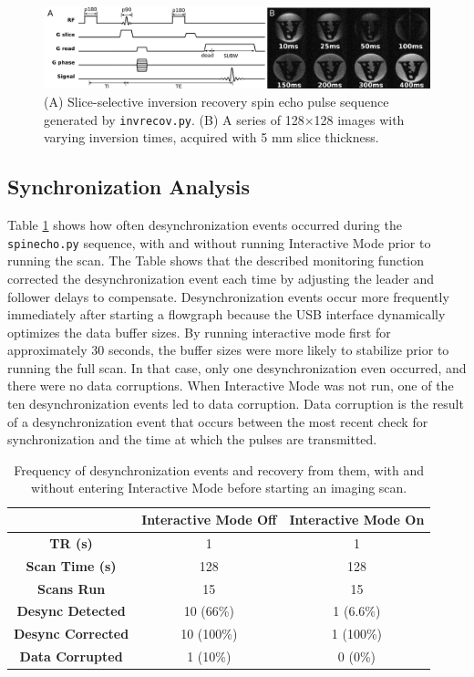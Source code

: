 \documentclass[10pt,letterpaper]{article}
\begin{document}
\begin{figure}[h]
\begin{center}
\includegraphics[width = 1\textwidth,trim=0 0 0 0,clip=false]{IR_results.png}
\caption{{(A) Slice-selective inversion recovery spin echo pulse sequence generated by \texttt{invrecov.py}. 
(B) A series of 128$\times$128 images with varying inversion times, acquired with 5 mm slice thickness.}}
\label{fig:ir_image}
\end{center}
\end{figure}

\subsection*{Synchronization Analysis}
Table \ref{table:sync_table} shows how often desynchronization events occurred during the \texttt{spinecho.py} sequence,
with and without running Interactive Mode prior to running the scan.
The Table shows that the described monitoring function corrected the desynchronization event each time by adjusting the leader and follower delays to compensate.
Desynchronization events occur more frequently immediately after starting a flowgraph 
because the USB interface dynamically optimizes the data buffer sizes.
By running interactive mode first for approximately 30 seconds, 
the buffer sizes were more likely to stabilize prior to running the full scan.
In that case, only one desynchronization even occurred, and there were no data corruptions.
When Interactive Mode was not run, 
one of the ten desynchronization events led to data corruption.
Data corruption is the result of a desynchronization event that occurs between the 
most recent check for synchronization and the time at which the pulses are transmitted.

\begin{table}
\begin{tabular}{| c | c | c |}
	\hline
	 & \textbf{Interactive Mode Off} & \textbf{Interactive Mode On} \\ \hline
	\textbf{TR (s)} & 1 & 1 \\ \hline
	\textbf{Scan Time (s)} & 128 & 128 \\ \hline
	\textbf{Scans Run} & 15 & 15 \\ \hline
	\textbf{Desync Detected} & 10 (66\%) & 1 (6.6\%) \\ \hline
	\textbf{Desync Corrected} & 10 (100\%) & 1 (100\%) \\ \hline
	\textbf{Data Corrupted} & 1 (10\%) & 0 (0\%) \\ \hline
\end{tabular}
\caption{Frequency of desynchronization events and recovery from them, 
with and without entering Interactive Mode before starting an imaging scan.}
\label{table:sync_table}
\end{table}
\end{document}
